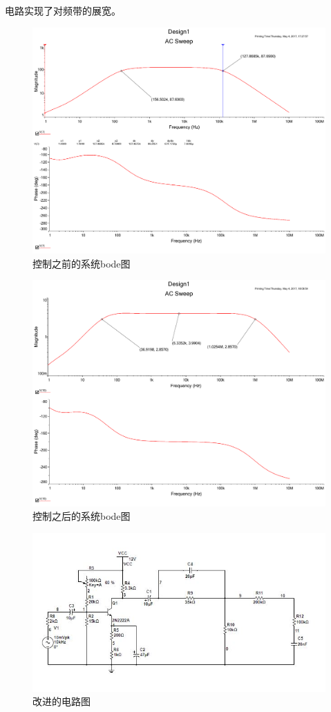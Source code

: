 \documentclass[UTF8,a4paper]{paper}
\begin{document}
电路实现了对频带的展宽。
\begin{figure}
\centering
\includegraphics[width=\textwidth]{BodeOri.pdf}
\caption{控制之前的系统bode图}
\label{mul}
\end{figure}

\begin{figure}
\centering
\includegraphics[width=\textwidth]{Bode.pdf}
\caption{控制之后的系统bode图}
\label{ref}
\end{figure}

\begin{figure}
\centering
\includegraphics[width=\textwidth]{Circuit.JPG}
\caption{改进的电路图}
\label{cir}
\end{figure}
\end{document}

